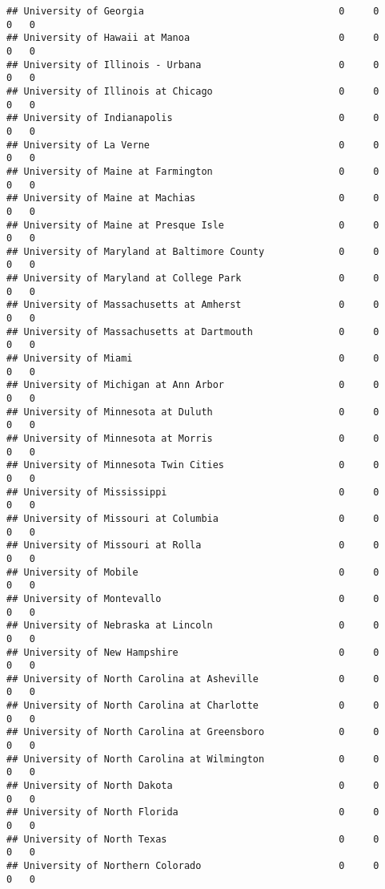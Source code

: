 \documentclass[
]{article}
\begin{document}
\begin{verbatim}
## University of Georgia                                  0     0        0   0
## University of Hawaii at Manoa                          0     0        0   0
## University of Illinois - Urbana                        0     0        0   0
## University of Illinois at Chicago                      0     0        0   0
## University of Indianapolis                             0     0        0   0
## University of La Verne                                 0     0        0   0
## University of Maine at Farmington                      0     0        0   0
## University of Maine at Machias                         0     0        0   0
## University of Maine at Presque Isle                    0     0        0   0
## University of Maryland at Baltimore County             0     0        0   0
## University of Maryland at College Park                 0     0        0   0
## University of Massachusetts at Amherst                 0     0        0   0
## University of Massachusetts at Dartmouth               0     0        0   0
## University of Miami                                    0     0        0   0
## University of Michigan at Ann Arbor                    0     0        0   0
## University of Minnesota at Duluth                      0     0        0   0
## University of Minnesota at Morris                      0     0        0   0
## University of Minnesota Twin Cities                    0     0        0   0
## University of Mississippi                              0     0        0   0
## University of Missouri at Columbia                     0     0        0   0
## University of Missouri at Rolla                        0     0        0   0
## University of Mobile                                   0     0        0   0
## University of Montevallo                               0     0        0   0
## University of Nebraska at Lincoln                      0     0        0   0
## University of New Hampshire                            0     0        0   0
## University of North Carolina at Asheville              0     0        0   0
## University of North Carolina at Charlotte              0     0        0   0
## University of North Carolina at Greensboro             0     0        0   0
## University of North Carolina at Wilmington             0     0        0   0
## University of North Dakota                             0     0        0   0
## University of North Florida                            0     0        0   0
## University of North Texas                              0     0        0   0
## University of Northern Colorado                        0     0        0   0

\end{verbatim}
\end{document}
